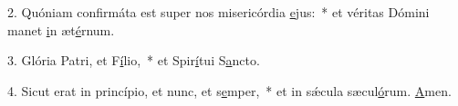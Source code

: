 2. Quóniam confirmáta est super nos misericórdia \uline{e}jus:~* et véritas Dómini manet \uline{i}n æt\uline{é}rnum.\par 
3. Glória Patri, et F\uline{í}lio,~* et Spir\uline{í}tui S\uline{a}ncto.\par 
4. Sicut erat in princípio, et nunc, et s\uline{e}mper,~* et in sǽcula sæcul\uline{ó}rum. \uline{A}men.\par 
